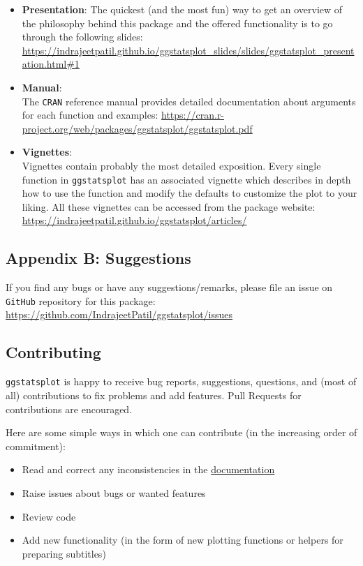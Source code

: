 \documentclass[]{article}
\begin{document}
\begin{itemize}
\item
  \textbf{Presentation}: The quickest (and the most fun) way to get an
  overview of the philosophy behind this package and the offered
  functionality is to go through the following slides:
  \url{https://indrajeetpatil.github.io/ggstatsplot_slides/slides/ggstatsplot_presentation.html\#1}
\item
  \textbf{Manual}:\\
  The \texttt{CRAN} reference manual provides detailed documentation
  about arguments for each function and examples:
  \url{https://cran.r-project.org/web/packages/ggstatsplot/ggstatsplot.pdf}
\item
  \textbf{Vignettes}:\\
  Vignettes contain probably the most detailed exposition. Every single
  function in \texttt{ggstatsplot} has an associated vignette which
  describes in depth how to use the function and modify the defaults to
  customize the plot to your liking. All these vignettes can be accessed
  from the package website:
  \url{https://indrajeetpatil.github.io/ggstatsplot/articles/}
\end{itemize}

\hypertarget{appendix-b-suggestions}{%
\subsection{Appendix B: Suggestions}\label{appendix-b-suggestions}}

If you find any bugs or have any suggestions/remarks, please file an
issue on \texttt{GitHub} repository for this package:
\url{https://github.com/IndrajeetPatil/ggstatsplot/issues}

\hypertarget{contributing}{%
\subsection{Contributing}\label{contributing}}

\texttt{ggstatsplot} is happy to receive bug reports, suggestions,
questions, and (most of all) contributions to fix problems and add
features. Pull Requests for contributions are encouraged.

Here are some simple ways in which one can contribute (in the increasing
order of commitment):

\begin{itemize}
\item
  Read and correct any inconsistencies in the
  \href{https://indrajeetpatil.github.io/ggstatsplot/}{documentation}
\item
  Raise issues about bugs or wanted features
\item
  Review code
\item
  Add new functionality (in the form of new plotting functions or
  helpers for preparing subtitles)
\end{itemize}
\end{document}
